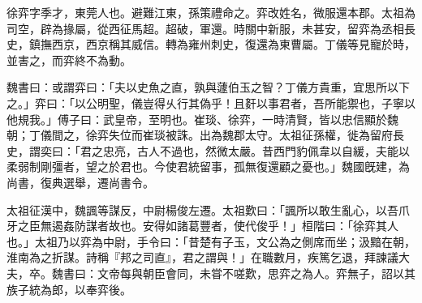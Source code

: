 
\begin{pinyinscope}
徐弈字季才，東莞人也。避難江東，孫策禮命之。弈改姓名，微服還本郡。太祖為司空，辟為掾屬，從西征馬超。超破，軍還。時關中新服，未甚安，留弈為丞相長史，鎮撫西京，西京稱其威信。轉為雍州刺史，復還為東曹屬。丁儀等見寵於時，並害之，而弈終不為動。

魏書曰：或謂弈曰：「夫以史魚之直，孰與蘧伯玉之智？丁儀方貴重，宜思所以下之。」弈曰：「以公明聖，儀豈得乆行其偽乎！且姧以事君者，吾所能禦也，子寧以他規我。」傅子曰：武皇帝，至明也。崔琰、徐弈，一時清賢，皆以忠信顯於魏朝；丁儀間之，徐弈失位而崔琰被誅。出為魏郡太守。太祖征孫權，徙為留府長史，謂奕曰：「君之忠亮，古人不過也，然微太嚴。昔西門豹佩韋以自緩，夫能以柔弱制剛彊者，望之於君也。今使君統留事，孤無復還顧之憂也。」魏國旣建，為尚書，復典選舉，遷尚書令。

太祖征漢中，魏諷等謀反，中尉楊俊左遷。太祖歎曰：「諷所以敢生亂心，以吾爪牙之臣無遏姦防謀者故也。安得如諸葛豐者，使代俊乎！」桓階曰：「徐弈其人也。」太祖乃以弈為中尉，手令曰：「昔楚有子玉，文公為之側席而坐；汲黯在朝，淮南為之折謀。詩稱『邦之司直』，君之謂與！」在職數月，疾篤乞退，拜諫議大夫，卒。魏書曰：文帝每與朝臣會同，未甞不嗟歎，思弈之為人。弈無子，詔以其族子統為郎，以奉弈後。


\end{pinyinscope}